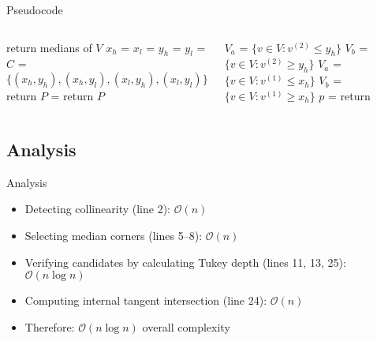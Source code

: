 \documentclass{beamer}
\newcommand{\order}[1]{\ensuremath{\mathcal{O}(#1)}}
\begin{document}
\algrenewcommand{}
\begin{frame}{Pseudocode}
  \tiny
  \begin{columns}[t]
    \begin{algorithmic}[1]
        \State return medians of $V$
      \Else
        \State $x_h$ = 
        \State $x_l$ = 
        \State $y_h$ = 
        \State $y_l$ = 
        \State $C$ = $\{(x_h, y_h), (x_h, y_l), (x_l, y_h), (x_l, y_l)\}$
        \Statex
          \State return 
        \Else
          \State $P$ = 
            \State return $P$
    \end{algorithmic}
    \begin{algorithmic}[1]
          \Else
              \State $V_a$ = $\{v \in V : v^{(2)} \leq y_h\}$
              \State $V_b$ = $\{v \in V : v^{(2)} \geq y_h\}$
            \Else
              \State $V_a$ = $\{v \in V : v^{(1)} \leq x_h\}$
              \State $V_b$ = $\{v \in V : v^{(1)} \geq x_h\}$
            \EndIf
            \Statex  
            \State $p$ = 
            \State return 
          \EndIf
          \EndIf
        \EndIf  
      \EndProcedure
    \end{algorithmic}
  \end{columns}
\end{frame}


\subsection{Analysis}
\begin{frame}{Analysis}
  \begin{itemize}
  \item Detecting collinearity (line 2): \order{n}
  \item Selecting median corners (lines 5--8): \order{n}
  \item Verifying candidates by calculating Tukey depth (lines 11, 13, 25): \order{n \log n}
  \item Computing internal tangent intersection (line 24): \order{n}
  \item Therefore: \order{n \log n} overall complexity
  \end{itemize}
\end{frame}
\end{document}
